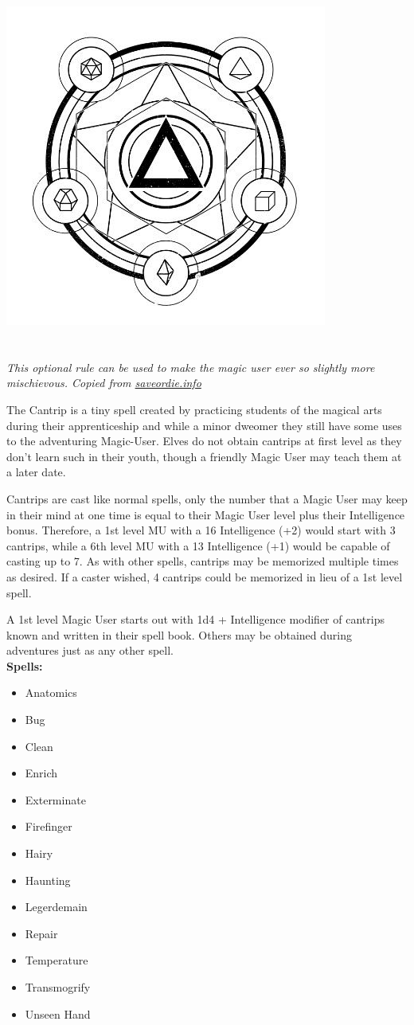 \documentclass[letterpaper,sansserif,tightsqueeze]{rpg-module}
\begin{document}
\vspace{0.5cm}

\begin{center}
	\includegraphics[width = 0.4\linewidth]{cantrip_logo.jpg}
\end{center}
\section*{}
\textit{This optional rule can be used to make the magic user ever so slightly more mischievous. Copied from \href{http://saveordie.info/?p=90}{saveordie.info}}

The Cantrip is a tiny spell created by practicing students of the magical arts during their apprenticeship and while a minor dweomer they still have some uses to the adventuring Magic-User. Elves do not obtain cantrips at first level as they don’t learn such in their youth, though a friendly Magic User may teach them at a later date.

Cantrips are cast like normal spells, only the number that a Magic User may keep in their mind at one time is equal to their Magic User level plus their Intelligence bonus. Therefore, a 1st level MU with a 16 Intelligence (+2) would start with 3 cantrips, while a 6th level MU with a 13 Intelligence (+1) would be capable of casting up to 7. As with other spells, cantrips may be memorized multiple times as desired. If a caster wished, 4 cantrips could be memorized in lieu of a 1st level spell.

A 1st level Magic User starts out with 1d4 + Intelligence modifier of cantrips known and written in their spell book. Others may be obtained during adventures just as any other spell.\\

\textbf{Spells:}
\begin{itemize}
	\item Anatomics
	\item Bug
	\item Clean
	\item Enrich
	\item Exterminate
	\item Firefinger
	\item Hairy
	\item Haunting
	\item Legerdemain
	\item Repair
	\item Temperature
	\item Transmogrify
	\item Unseen Hand
\end{itemize}
\end{document}
